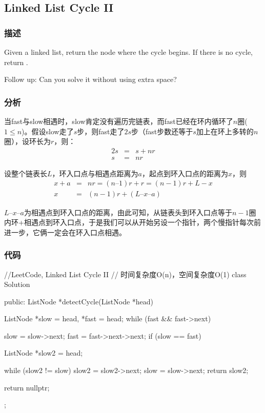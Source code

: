 \subsection{Linked List Cycle II}
\label{sec:linked-list-cycle-ii}


\subsubsection{描述}
Given a linked list, return the node where the cycle begins. If there is no cycle, return .

Follow up:
Can you solve it without using extra space?


\subsubsection{分析}
当fast与slow相遇时，slow肯定没有遍历完链表，而fast已经在环内循环了$n$圈($1 \leq n$)。假设slow走了$s$步，则fast走了$2s$步（fast步数还等于$s$加上在环上多转的$n$圈），设环长为$r$，则：
\begin{eqnarray}
2s &=& s + nr \nonumber \\
s &=& nr \nonumber
\end{eqnarray}

设整个链表长$L$，环入口点与相遇点距离为$a$，起点到环入口点的距离为$x$，则
\begin{eqnarray}
x + a &=& nr = (n – 1)r +r = (n-1)r + L - x \nonumber \\
x &=& (n-1)r + (L – x – a) \nonumber
\end{eqnarray}

$L – x – a$为相遇点到环入口点的距离，由此可知，从链表头到环入口点等于$n-1$圈内环+相遇点到环入口点，于是我们可以从开始另设一个指针，两个慢指针每次前进一步，它俩一定会在环入口点相遇。


\subsubsection{代码}
\begin{Code}
//LeetCode, Linked List Cycle II
// 时间复杂度O(n)，空间复杂度O(1)
class Solution {
public:
    ListNode *detectCycle(ListNode *head) {
        ListNode *slow = head, *fast = head;
        while (fast && fast->next) {
            slow = slow->next;
            fast = fast->next->next;
            if (slow == fast) {
                ListNode *slow2 = head;

                while (slow2 != slow) {
                    slow2 = slow2->next;
                    slow = slow->next;
                }
                return slow2;
            }
        }
        return nullptr;
    }
};
\end{Code}


